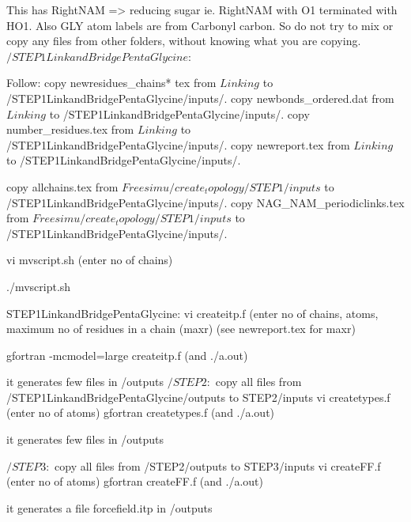 This has RightNAM => reducing sugar ie. RightNAM with O1 terminated with HO1.
Also GLY atom labels are from Carbonyl carbon. So do not try to mix  or copy any files from other folders, without knowing what you are copying.
$/STEP1LinkandBridgePentaGlycine:$ 

Follow:
copy newresidues_chains* tex          from $Linking$ to /STEP1LinkandBridgePentaGlycine/inputs/.
copy newbonds_ordered.dat             from $Linking$ to /STEP1LinkandBridgePentaGlycine/inputs/.
copy number_residues.tex              from $Linking$ to /STEP1LinkandBridgePentaGlycine/inputs/.
copy newreport.tex                    from $Linking$ to /STEP1LinkandBridgePentaGlycine/inputs/.

copy allchains.tex                    from $Freesimu/create_topology/STEP1/inputs$  to  /STEP1LinkandBridgePentaGlycine/inputs/.
copy NAG_NAM_periodiclinks.tex        from $Freesimu/create_topology/STEP1/inputs$  to  /STEP1LinkandBridgePentaGlycine/inputs/.

vi mvscript.sh  (enter no of chains)

./mvscript.sh

STEP1LinkandBridgePentaGlycine:  vi createitp.f
            (enter no of chains, atoms, maximum no of residues in a chain (maxr) (see newreport.tex for maxr)

gfortran -mcmodel=large createitp.f  (and ./a.out)

it generates few files in /outputs
$/STEP2:$
copy all files from /STEP1LinkandBridgePentaGlycine/outputs to  STEP2/inputs
vi createtypes.f  (enter no of atoms)
gfortran createtypes.f  (and ./a.out)

it generates few files in /outputs

$/STEP3:$
copy all files from /STEP2/outputs to  STEP3/inputs
vi createFF.f  (enter no of atoms)
gfortran createFF.f  (and ./a.out)

it generates a file forcefield.itp in /outputs

